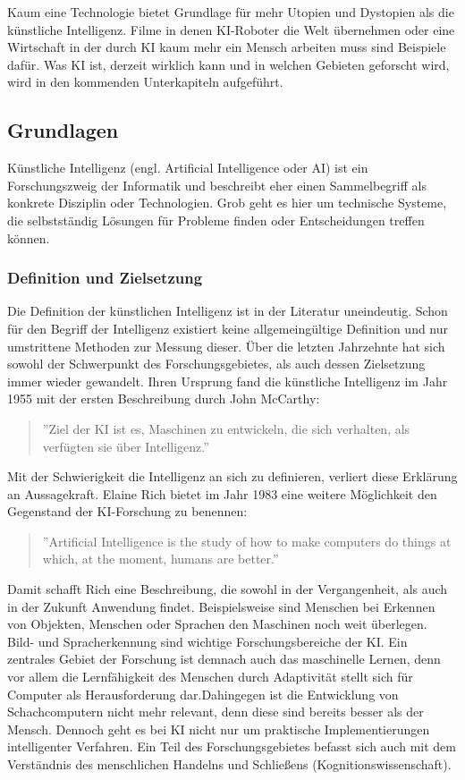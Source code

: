 \documentclass[a4paper,12pt, german]{report}
\begin{document}
Kaum eine Technologie bietet Grundlage für mehr Utopien und Dystopien als die künstliche Intelligenz. Filme in denen KI-Roboter die Welt übernehmen oder eine Wirtschaft in der durch KI kaum mehr ein Mensch arbeiten muss sind Beispiele dafür. Was KI ist, derzeit wirklich kann und in welchen Gebieten geforscht wird, wird in den kommenden Unterkapiteln aufgeführt. 

\subsection{Grundlagen}

Künstliche Intelligenz (engl. Artificial Intelligence oder AI) ist ein Forschungszweig der Informatik und beschreibt eher einen Sammelbegriff als konkrete Disziplin oder Technologien. Grob geht es hier um technische Systeme, die selbstständig Lösungen für Probleme finden oder Entscheidungen treffen können. \cite{01} \cite{10}

\subsubsection{Definition und Zielsetzung}
Die Definition der künstlichen Intelligenz ist in der Literatur uneindeutig. Schon für den Begriff der Intelligenz existiert keine allgemeingültige Definition und nur umstrittene Methoden zur Messung dieser. Über die letzten Jahrzehnte hat sich sowohl der Schwerpunkt des Forschungsgebietes, als auch dessen Zielsetzung immer wieder gewandelt. Ihren Ursprung fand die künstliche Intelligenz im Jahr 1955 mit der ersten Beschreibung durch John McCarthy:
\begin{quote}
  ''Ziel der KI ist es, Maschinen zu entwickeln, die sich verhalten, als verfügten sie über Intelligenz.''
\end{quote}
 Mit der Schwierigkeit die Intelligenz an sich zu definieren, verliert diese Erklärung an Aussagekraft. Elaine Rich bietet im Jahr 1983 eine weitere Möglichkeit den Gegenstand der KI-Forschung zu benennen: 

 \begin{quote}
  ''Artificial Intelligence is the study of how to make computers do things at which, at the moment, humans are better.''
 \end{quote} 

 Damit schafft Rich eine Beschreibung, die sowohl in der Vergangenheit, als auch in der Zukunft Anwendung findet. Beispielsweise sind Menschen bei Erkennen von Objekten, Menschen oder Sprachen den Maschinen noch weit überlegen. Bild- und Spracherkennung sind wichtige Forschungsbereiche der KI. Ein zentrales Gebiet der Forschung ist demnach auch das maschinelle Lernen, denn vor allem die Lernfähigkeit des Menschen durch Adaptivität stellt sich für Computer als Herausforderung dar.Dahingegen ist die Entwicklung von Schachcomputern nicht mehr relevant, denn diese sind bereits besser als der Mensch. Dennoch geht es bei KI nicht nur um praktische Implementierungen intelligenter Verfahren. Ein Teil des Forschungsgebietes befasst sich auch mit dem Verständnis des menschlichen Handelns und Schließens (Kognitionswissenschaft).
 \cite{11}
\end{document}
